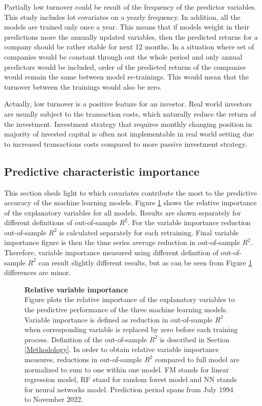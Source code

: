 \documentclass[12pt]{article}
\begin{document}
Partially low turnover could be result of the frequency of the predictor variables. This study includes lot covariates on a yearly frequency. In addition, all the models are trained only once a year. This means that if models weight in their predictions more the annually updated variables, then the predicted returns for a company should be rather stable for next 12 months. In a situation where set of companies would be constant through out the whole period and only annual predictors would be included, order of the predicted returns of the companies would remain the same between model re-trainings. This would mean that the turnover between the trainings would also be zero. \par

Actually, low turnover is a positive feature for an investor. Real world investors are usually subject to the transaction costs, which naturally reduce the return of the investment. Investment strategy that requires monthly changing position in majority of invested capital is often not implementable in real world setting due to increased transactions costs compared to more passive investment strategy. \par

\subsection{Predictive characteristic importance}\label{PredictiveCharacteristicImportance}

This section sheds light to which covariates contribute the most to the predictive accuracy of the machine learning models. Figure \ref{plot:relative_VI} shows the relative importance of the explanatory variables for all models. Results are shown separately for different definitions of out-of-sample $R^2$. For the variable importance reduction out-of-sample $R^2$ is calculated separately for each retraining. Final variable importance figure is then the time series average reduction in out-of-sample $R^2$. Therefore, variable importance measured using different definition of out-of-sample $R^2$ can result slightly different results, but as can be seen from Figure \ref{plot:relative_VI} differences are minor. \par

\begin{figure}[p]
\centering
\caption[Relative variable importance]{\textbf{Relative variable importance}\\ Figure plots the relative importance of the explanatory variables to the predictive performance of the three machine learning models. Variable importance is defined as reduction in out-of-sample $R^2$ when corresponding variable is replaced by zero before each training process. Definition of the out-of-sample $R^2$ is described in Section \ref{Methodology}. In order to obtain relative variable importance measures, reductions in out-of-sample $R^2$ compared to full model are normalized to sum to one within one model. FM stands for linear regression model, RF stand for random forest model and NN stands for neural networks model. Prediction period spans from July 1994 to November 2022.}

\label{plot:relative_VI}
\end{figure}
\end{document}
